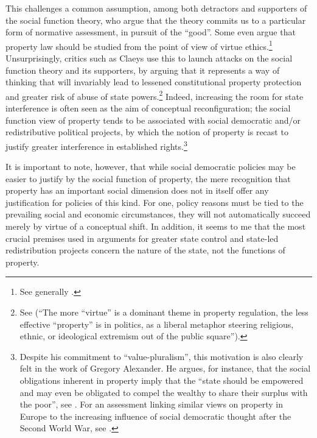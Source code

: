 This challenges a common assumption, among both detractors and supporters of the social function theory, who argue that the theory commits us to a particular form of normative assessment, in pursuit of the ``good''. Some even argue that property law should be studied from the point of view of virtue ethics.\footnote{See generally \cite{penalver09}.} Unsurprisingly, critics such as Claeys use this to launch attacks on the social function theory and its supporters, by arguing that it represents a way of thinking that will invariably lead to lessened constitutional property protection and greater risk of abuse of state powers.\footnote{See \cite{claeys09} (``The more ``virtue'' is a dominant theme in property regulation, the less effective ``property'' is in politics, as a liberal metaphor steering religious, ethnic, or ideological extremism out of the public square'').} Indeed, increasing the room for state interference is often seen as the aim of conceptual reconfiguration; the social function view of property tends to be associated with social democratic and/or redistributive political projects, by which the notion of property is recast to justify greater interference in established rights.\footnote{Despite his commitment to ``value-pluralism'', this motivation is also clearly felt in the work of Gregory Alexander. He argues, for instance, that the social obligations inherent in property imply that the ``state should be empowered and may even be obligated to compel the wealthy to share their surplus with the poor'', see \cite[746]{alexander09}. For an assessment linking similar views on property in Europe to the increasing influence of social democratic thought after the Second World War, see \cite{allen10}.}

It is important to note, however, that while social democratic policies may be easier to justify by  the social function of property, the mere recognition that property has an important social dimension does not in itself offer any justification for policies of this kind. For one, policy reasons must be tied to the prevailing social and economic circumstances, they will not automatically succeed merely by virtue of a conceptual shift. In addition, it seems to me that the most crucial premises used in arguments for greater state control and state-led redistribution projects concern the nature of the state, not the functions of property.

